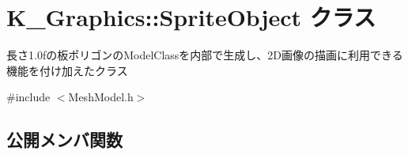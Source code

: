 \hypertarget{class_k___graphics_1_1_sprite_object}{}\section{K\+\_\+\+Graphics\+:\+:Sprite\+Object クラス}
\label{class_k___graphics_1_1_sprite_object}


長さ1.0fの板ポリゴンの\+Model\+Classを内部で生成し、2\+D画像の描画に利用できる機能を付け加えたクラス  




{\ttfamily \#include $<$Mesh\+Model.\+h$>$}

\subsection*{公開メンバ関数}
